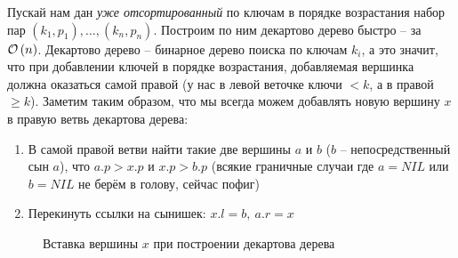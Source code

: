 Пускай нам дан \emph{уже отсортированный} по ключам в порядке возрастания набор пар $(k_1, p_1), \ldots, (k_n, p_n)$. 
Построим по ним декартово дерево быстро -- за $\mathcal{O}\left(n\right)$. Декартово дерево -- бинарное дерево поиска по ключам $k_i$, а это значит, что при добавлении ключей в порядке возрастания, добавляемая вершинка должна оказаться самой правой (у нас в левой веточке ключи $< k$, а в правой $\geq k$). Заметим таким образом, что мы всегда можем добавлять новую вершину $x$ в правую ветвь декартова дерева:

\begin{enumerate}[label=\arabic*.]
\item В самой правой ветви найти такие две вершины $a$ и $b$ ($b$ -- непосредственный сын $a$), что $a.p > x.p$ и $x.p > b.p$ (всякие граничные случаи где $a = NIL$ или $b = NIL$ не берём в голову, сейчас пофиг)
\item Перекинуть ссылки на сынишек: $x.l = b,\ a.r = x$
\end{enumerate}

\begin{figure}[ht!]
\centering
{}
\caption{Вставка вершины $x$ при построении декартова дерева}
\end{figure}

